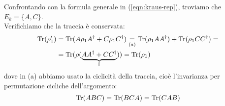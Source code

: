\documentclass[../../InformazioneQuantistica.tex]{subfiles}
\begin{document}
Confrontando con la formula generale in (\ref{eqn:kraus-rep}), troviamo che $E_k = \{A,C\}$.\\
Verifichiamo che la traccia è conservata:
\begin{align*}
\operatorname{Tr}(\rho_1') &= \operatorname{Tr}(A\rho_1 A^\dag + C\rho_1 C^\dag) \underset{(a)}{=} \operatorname{Tr}(\rho_1 A A^\dag) + \operatorname{Tr}(\rho_1 CC^\dag) =\\
&= \operatorname{Tr}(\rho(\underbrace{AA^\dag + CC^\dag}_{\mathbb{I}})) = \operatorname{Tr}(\rho_1)
\end{align*}
dove in (a) abbiamo usato la ciclicità della traccia, cioè l'invarianza per permutazione cicliche dell'argomento:
\begin{align*}
\operatorname{Tr}(ABC)=\operatorname{Tr}(BCA) = \operatorname{Tr}(CAB)
\end{align*}

\begin{comment}
Con operazioni di questo tipo possiamo esplorare stati \q{all'interno} della sfera di Bloch, considerando quindi un'evoluzione non unitaria, dato che si perde la reversibilità. Per esempio, l'origine della sfera di Bloch corrisponde allo stato massimamente misto, e chiaramente un'evoluzione che porta dalla superficie della sfera di Bloch all'origine non può essere reversibile, dato che l'informazione del punto di partenza viene persa nel tragitto.


\end{comment}
\end{document}
